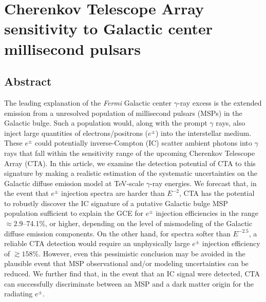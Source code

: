 \documentclass[doublespace,nopageskip]{VTthesis}
\begin{document}
\chapter{Cherenkov Telescope Array sensitivity to Galactic center millisecond pulsars}\label{ch:CTA}

\section{Abstract}

The leading explanation of the \textit{Fermi} Galactic center $\gamma$-ray excess is the extended emission from a unresolved population of millisecond
pulsars (MSPs) in the Galactic bulge. Such a population would, along with the prompt $\gamma$ rays, also inject large quantities of electrons/positrons ($e^\pm$) into the interstellar medium. These $e^\pm$ could potentially inverse-Compton (IC) scatter ambient photons into $\gamma$ rays that fall within the sensitivity range of the upcoming Cherenkov Telescope Array (CTA). In this article, we examine the detection potential of CTA to this signature by making a realistic estimation of the systematic uncertainties on the Galactic diffuse emission model at TeV-scale $\gamma$-ray energies. We forecast that, in the event that $e^\pm$ injection spectra are harder than $E^{-2}$, CTA has the potential to robustly discover the IC signature of 
a putative Galactic bulge MSP population sufficient to explain the GCE for $e^\pm$ injection efficiencies in the range $\approx 2.9$--74.1\%, or higher, depending on the level of mismodeling of the Galactic diffuse emission components. On the other hand, for spectra softer than $E^{-2.5}$, a reliable CTA detection would require an unphysically large $e^\pm$ injection efficiency of $\gtrsim 158\%$. However, even this pessimistic conclusion may be avoided in the plausible event that
MSP observational and/or modeling uncertainties can be reduced. We further find that, in the event that an IC signal were detected, CTA can successfully discriminate between an MSP and a dark matter origin for the radiating $e^\pm$.

\end{document}

